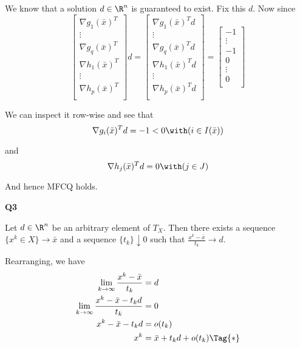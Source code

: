 We know that a solution $d\in\R^n$ is guaranteed to exist. Fix this
$d$. Now since
$$
	\begin{bmatrix}
		\nabla g_1(\bar x)^T \\
		\vdots               \\
		\nabla g_q(\bar x)^T \\
		\nabla h_1(\bar x)^T \\
		\vdots               \\
		\nabla h_p(\bar x)^T \\
	\end{bmatrix}d =
	\begin{bmatrix}
		\nabla g_1(\bar x)^Td \\
		\vdots                \\
		\nabla g_q(\bar x)^Td \\
		\nabla h_1(\bar x)^Td \\
		\vdots                \\
		\nabla h_p(\bar x)^Td \\
	\end{bmatrix} =
	\begin{bmatrix}
		-1     \\
		\vdots \\
		-1     \\
		0      \\
		\vdots \\
		0      \\
	\end{bmatrix}
$$

We can inspect it row-wise and see that
$$
  \nabla g_i(\bar x)^Td=-1<0\with(i\in I(\bar x))
$$

and
$$
  \nabla h_j(\bar x)^Td=0\with(j\in J)
$$

And hence MFCQ holds.
\def\TC{T_X(\bar x)}
\def\LC{L_X(\bar x)}
\def\lk{\lim_{k\to\infty}}
\def\nf{\nabla f}
\def\n{\nabla}
\def\f{\frac}
\def\bx{\bar x}

\newpage
{\large\textbf{Q3}}

Let $d\in\R^n$ be an arbitrary element of $T_X$. Then there exists a
sequence $\{x^k\in X\}\to\bar x$ and a sequence $\{t_k\}\downarrow0$
such that $\frac{x^k-\bar x}{t_k}\to d$.

Rearranging, we have
\begin{align*}
	\lim_{k\to\infty}\frac{x^k-\bar x}{t_k}      & =d                              \\
	\lim_{k\to\infty}\frac{x^k-\bar x-t_kd}{t_k} & =0                              \\
	x^k-\bar x-t_kd                              & = o(t_k)                        \\
	x^k                                          & = \bar x + t_kd + o(t_k)\Tag{*}
\end{align*}

